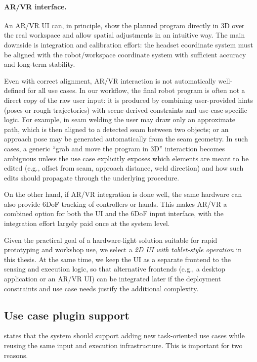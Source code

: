 \paragraph{AR/VR interface.}
An AR/VR UI can, in principle, show the planned program directly in 3D over the real workspace and allow spatial adjustments in an intuitive way. The main downside is integration and calibration effort: the headset coordinate system must be aligned with the robot/workspace coordinate system with sufficient accuracy and long-term stability.

Even with correct alignment, AR/VR interaction is not automatically well-defined for all use cases. In our workflow, the final robot program is often not a direct copy of the raw user input: it is produced by combining user-provided hints (poses or rough trajectories) with scene-derived constraints and use-case-specific logic. For example, in seam welding the user may draw only an approximate path, which is then aligned to a detected seam between two objects; or an approach pose may be generated automatically from the seam geometry. In such cases, a generic ``grab and move the program in 3D'' interaction becomes ambiguous unless the use case explicitly exposes which elements are meant to be edited (e.g., offset from seam, approach distance, weld direction) and how such edits should propagate through the underlying procedure.

On the other hand, if AR/VR integration is done well, the same hardware can also provide 6DoF tracking of controllers or hands. This makes AR/VR a combined option for both the UI and the 6DoF input interface, with the integration effort largely paid once at the system level.


Given the practical goal of a hardware-light solution suitable for rapid prototyping and workshop use, we select a \emph{2D UI with tablet-style operation} in this thesis. At the same time, we keep the UI as a separate frontend to the sensing and execution logic, so that alternative frontends (e.g., a desktop application or an AR/VR UI) can be integrated later if the deployment constraints and use case needs justify the additional complexity.



\subsection{Use case plugin support} \label{subsec:ch2_analysis_use_case_plugins}

 states that the system should support adding new task-oriented use cases while reusing the same input and execution infrastructure. This is important for two reasons.

